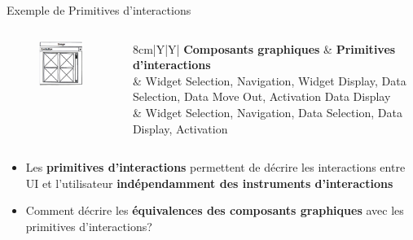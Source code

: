 \documentclass[11pt]{beamer}
\begin{document}
\begin{frame}[t]{Exemple de Primitives d'interactions}
\begin{columns}
	\begin{column}{0.3\textwidth}
	\begin{figure}[h]
	\begin{center}
	\includegraphics[scale=.3]{../chap4/img-1}
	\end{center}
	\end{figure}
	\end{column}
	\begin{column}{.8\textwidth}
	\begin{table}[t]
	\begin{tabularx}{8cm}{|Y|Y|}
	\hline  \textbf{{\tiny Composants graphiques}} & \textbf{{\tiny Primitives d'interactions} }\\ 
	 & 
			{\tiny 	Widget Selection, Navigation, Widget Display, Data Selection,  Data Move Out, Activation  \newline Data Display }\\ 
	& 
				{\tiny Widget Selection, Navigation, Data Selection, Data Display, Activation} \\ 
	\hline 
	
	\end{tabularx} 
	\end{table}
	
	\end{column}
\end{columns}
\pause
	\begin{itemize}
		\item {\scriptsize Les \textbf{primitives d'interactions} permettent de décrire les interactions entre UI et l'utilisateur \textbf{indépendamment des instruments d'interactions} }
		\item {\scriptsize Comment décrire les \textbf{équivalences des composants graphiques} avec les primitives d'interactions?} 
	\end{itemize}
\end{frame}
\end{document}
